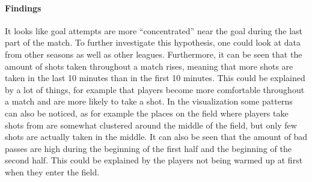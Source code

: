 \documentclass[Report.tex]{subfiles}
\begin{document}
\paragraph{Findings\\}
It looks like goal attempts are more ``concentrated'' near the goal during the last part of the match. To further investigate this hypothesis, one could look at data from other seasons as well as other leagues. Furthermore, it can be seen that the amount of shots taken throughout a match rises, meaning that more shots are taken in the last 10 minutes than in the first 10 minutes. This could be explained by a lot of things, for example that players become more comfortable throughout a match and are more likely to take a shot. In the visualization some patterns can also be noticed, as for example the places on the field where players take shots from are somewhat clustered around the middle of the field, but only few shots are actually taken in the middle. It can also be seen that the amount of bad passes are high during the beginning of the first half and the beginning of the second half. This could be explained by the players not being warmed up at first when they enter the field.
\end{document}
